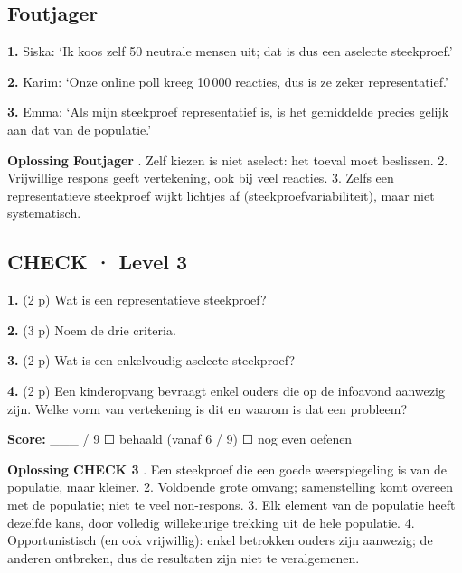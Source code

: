 \subsection*{Foutjager}

\textbf{1.} Siska: ‘Ik koos zelf 50 neutrale mensen uit; dat is dus een aselecte steekproef.’ \lijn

\textbf{2.} Karim: ‘Onze online poll kreeg 10\,000 reacties, dus is ze zeker representatief.’ \lijn

\textbf{3.} Emma: ‘Als mijn steekproef representatief is, is het gemiddelde precies gelijk aan dat van de populatie.’ \lijn

\begin{oplossing}
\textbf{Oplossing Foutjager} . Zelf kiezen is niet aselect: het toeval moet beslissen. 2. Vrijwillige respons geeft vertekening, ook bij veel reacties. 3. Zelfs een representatieve steekproef wijkt lichtjes af (steekproefvariabiliteit), maar niet systematisch.
\end{oplossing}

\subsection*{CHECK · Level 3}

\textbf{1.} (2 p) Wat is een representatieve steekproef? \lijn

\textbf{2.} (3 p) Noem de drie criteria. \lijn

\textbf{3.} (2 p) Wat is een enkelvoudig aselecte steekproef? \lijn

\textbf{4.} (2 p) Een kinderopvang bevraagt enkel ouders die op de infoavond aanwezig zijn. Welke vorm van vertekening is dit en waarom is dat een probleem? \lijn

\begin{doel}
\textbf{Score:} \_\_\_ / 9 \quad ☐ behaald (vanaf 6 / 9) \quad ☐ nog even oefenen
\end{doel}

\begin{oplossing}
\textbf{Oplossing CHECK 3} . Een steekproef die een goede weerspiegeling is van de populatie, maar kleiner. 2. Voldoende grote omvang; samenstelling komt overeen met de populatie; niet te veel non-respons. 3. Elk element van de populatie heeft dezelfde kans, door volledig willekeurige trekking uit de hele populatie. 4. Opportunistisch (en ook vrijwillig): enkel betrokken ouders zijn aanwezig; de anderen ontbreken, dus de resultaten zijn niet te veralgemenen.
\end{oplossing}
